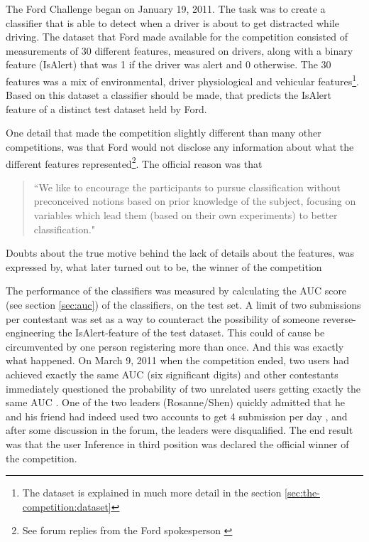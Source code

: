 The Ford Challenge began on January 19, 2011. The task was to create a classifier that is able to detect when a driver is about to get distracted while driving. The dataset that Ford made available for the competition consisted of measurements of 30 different features, measured on drivers, along with a binary feature (IsAlert) that was 1 if the driver was alert and 0 otherwise. The 30 features was a mix of environmental, driver physiological and vehicular features\footnote{The dataset is explained in much more detail in the section \ref{sec:the-competition:dataset}}. Based on this dataset a classifier should be made, that predicts the IsAlert feature of a distinct test dataset held by Ford. \par
One detail that made the competition slightly different than many other competitions, was that Ford would not disclose any information about what the different features represented\footnote{See forum replies from the Ford spokesperson \citep{kaggle_forum_266,kaggle_forum_317}}. The official reason was that 
\begin{quote}
    ``We like to encourage the participants to pursue classification without preconceived notions based on prior knowledge of the subject, focusing on variables which lead them (based on their own experiments) to better classification." \citep{kaggle_forum_268_reply_2}
\end{quote}
Doubts about the true motive behind the lack of details about the features, was expressed by, what later turned out to be, the winner of the competition \citep{kaggle_forum_295_reply_3} \par

The performance of the classifiers was measured by calculating the AUC score (see section \ref{sec:auc}) of the classifiers, on the test set. A limit of two submissions per contestant was set as a way to counteract the possibility of someone reverse-engineering the IsAlert-feature of the test dataset. This could of cause be circumvented by one person registering more than once. And this was exactly what happened. On March 9, 2011 when the competition ended, two users had achieved exactly the same AUC (six significant digits) and other contestants immediately questioned the probability of two unrelated users getting exactly the same AUC \citep{kaggle_forum_327_reply_1}. One of the two leaders (Rosanne/Shen) quickly admitted that he and his friend had indeed used two accounts to get 4 submission per day \citep{kaggle_forum_327_reply_4}, and after some discussion in the forum, the leaders were disqualified. The end result was that the user Inference in third position was declared the official winner of the competition. \par

